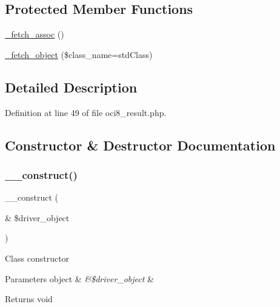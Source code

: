 \subsection*{Protected Member Functions}
\begin{DoxyCompactItemize}
\item 
\mbox{\hyperlink{class_c_i___d_b__oci8__result_a43a9a92817f1334a1c10752ec44275a0}{\+\_\+fetch\+\_\+assoc}} ()
\item 
\mbox{\hyperlink{class_c_i___d_b__oci8__result_a60806be6a9c2488820813c2a7f4fef71}{\+\_\+fetch\+\_\+object}} (\$class\+\_\+name=\textquotesingle{}std\+Class\textquotesingle{})
\end{DoxyCompactItemize}


\subsection{Detailed Description}


Definition at line 49 of file oci8\+\_\+result.\+php.



\subsection{Constructor \& Destructor Documentation}
\mbox{\label{class_c_i___d_b__oci8__result_a8e093c8b6e5733bc3f306385ee426ab7}} 
\subsubsection{\texorpdfstring{\_\_construct()}{\_\_construct()}}
{\footnotesize\ttfamily \+\_\+\+\_\+construct (\begin{DoxyParamCaption}\item[{\&}]{\$driver\+\_\+object }\end{DoxyParamCaption})}

Class constructor


\begin{DoxyParams}[1]{Parameters}
object & {\em \&\$driver\+\_\+object} & \\
\hline
\end{DoxyParams}
\begin{DoxyReturn}{Returns}
void 
\end{DoxyReturn}


